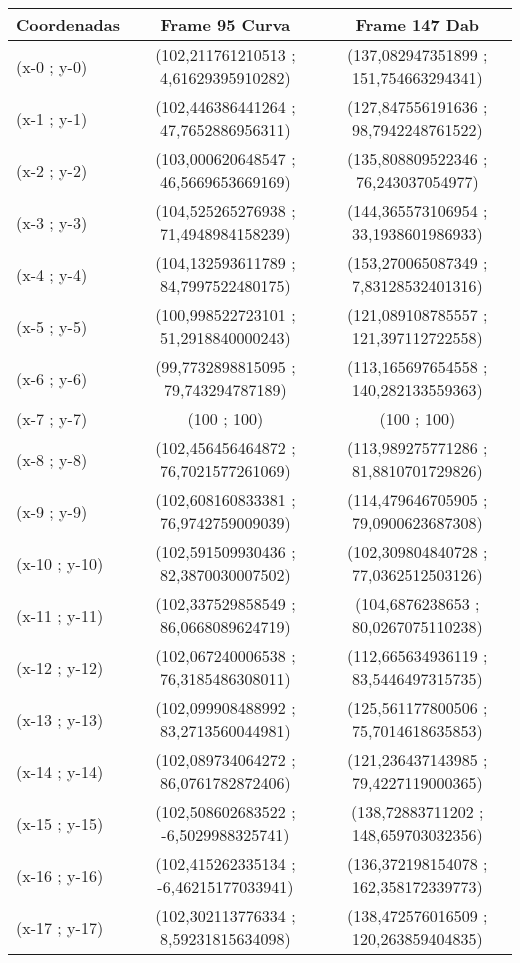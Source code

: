 \begin{table}[htbp]
	\centering
	\begin{tabular}{|l|c|c|}
		\hline
		Coordenadas & Frame 95 Curva & Frame 147 Dab \\ \hline
		(x-0 ; y-0) & (102,211761210513 ; 4,61629395910282) & (137,082947351899 ; 151,754663294341) \\
		(x-1 ; y-1) & (102,446386441264 ; 47,7652886956311) & (127,847556191636 ; 98,7942248761522) \\
		(x-2 ; y-2) & (103,000620648547 ; 46,5669653669169) & (135,808809522346 ; 76,243037054977) \\
		(x-3 ; y-3) & (104,525265276938 ; 71,4948984158239) & (144,365573106954 ; 33,1938601986933) \\
		(x-4 ; y-4) & (104,132593611789 ; 84,7997522480175) & (153,270065087349 ; 7,83128532401316) \\
		(x-5 ; y-5) & (100,998522723101 ; 51,2918840000243) & (121,089108785557 ; 121,397112722558) \\
		(x-6 ; y-6) & (99,7732898815095 ; 79,743294787189) & (113,165697654558 ; 140,282133559363) \\
		(x-7 ; y-7) & (100 ; 100) & (100 ; 100) \\
		(x-8 ; y-8) & (102,456456464872 ; 76,7021577261069) & (113,989275771286 ; 81,8810701729826) \\
		(x-9 ; y-9) & (102,608160833381 ; 76,9742759009039) & (114,479646705905 ; 79,0900623687308) \\
		(x-10 ; y-10) & (102,591509930436 ; 82,3870030007502) & (102,309804840728 ; 77,0362512503126) \\
		(x-11 ; y-11) & (102,337529858549 ; 86,0668089624719) & (104,6876238653 ; 80,0267075110238) \\
		(x-12 ; y-12) & (102,067240006538 ; 76,3185486308011) & (112,665634936119 ; 83,5446497315735) \\
		(x-13 ; y-13) & (102,099908488992 ; 83,2713560044981) & (125,561177800506 ; 75,7014618635853) \\
		(x-14 ; y-14) & (102,089734064272 ; 86,0761782872406) & (121,236437143985 ; 79,4227119000365) \\
		(x-15 ; y-15) & (102,508602683522 ; -6,5029988325741) & (138,72883711202 ; 148,659703032356) \\
		(x-16 ; y-16) & (102,415262335134 ; -6,46215177033941) & (136,372198154078 ; 162,358172339773) \\
		(x-17 ; y-17) & (102,302113776334 ; 8,59231815634098) & (138,472576016509 ; 120,263859404835) \\

\end{tabular}
\end{table}

